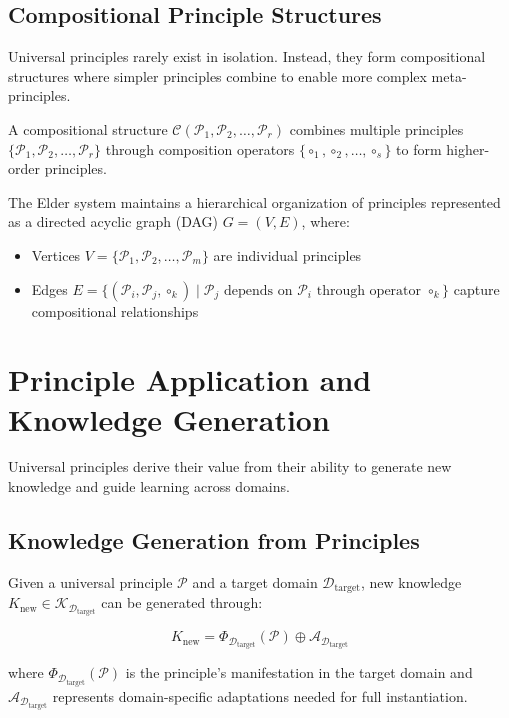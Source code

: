 \subsection{Compositional Principle Structures}

Universal principles rarely exist in isolation. Instead, they form compositional structures where simpler principles combine to enable more complex meta-principles.



\begin{definition}
A compositional structure $\mathcal{C}(\mathcal{P}_1, \mathcal{P}_2, \ldots, \mathcal{P}_r)$ combines multiple principles $\{\mathcal{P}_1, \mathcal{P}_2, \ldots, \mathcal{P}_r\}$ through composition operators $\{\circ_1, \circ_2, \ldots, \circ_s\}$ to form higher-order principles.
\end{definition}

The Elder system maintains a hierarchical organization of principles represented as a directed acyclic graph (DAG) $G = (V, E)$, where:
\begin{itemize}
    \item Vertices $V = \{\mathcal{P}_1, \mathcal{P}_2, \ldots, \mathcal{P}_m\}$ are individual principles
    \item Edges $E = \{(\mathcal{P}_i, \mathcal{P}_j, \circ_k) \mid \mathcal{P}_j \text{ depends on } \mathcal{P}_i \text{ through operator } \circ_k\}$ capture compositional relationships
\end{itemize}

\section{Principle Application and Knowledge Generation}

Universal principles derive their value from their ability to generate new knowledge and guide learning across domains.

\subsection{Knowledge Generation from Principles}

\begin{theorem}
Given a universal principle $\mathcal{P}$ and a target domain $\mathcal{D}_{\text{target}}$, new knowledge $K_{\text{new}} \in \mathcal{K}_{\mathcal{D}_{\text{target}}}$ can be generated through:

\begin{equation}
K_{\text{new}} = \Phi_{\mathcal{D}_{\text{target}}}(\mathcal{P}) \oplus \mathcal{A}_{\mathcal{D}_{\text{target}}}
\end{equation}

where $\Phi_{\mathcal{D}_{\text{target}}}(\mathcal{P})$ is the principle's manifestation in the target domain and $\mathcal{A}_{\mathcal{D}_{\text{target}}}$ represents domain-specific adaptations needed for full instantiation.
\end{theorem}

